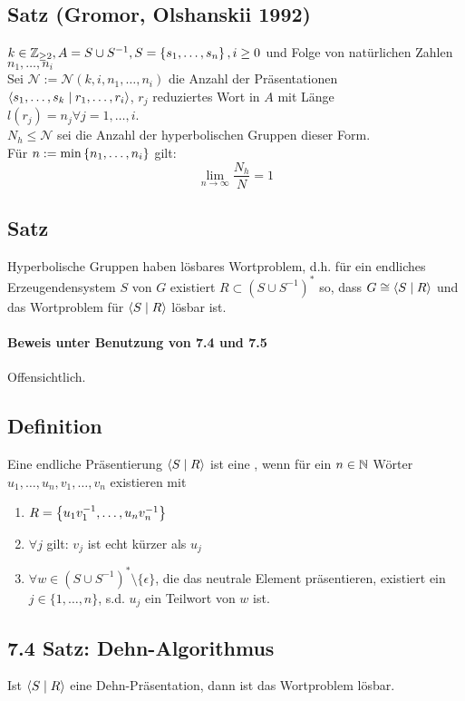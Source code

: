 \documentclass{article}
\begin{document}
\subsection{Satz (Gromor, Olshanskii 1992)}
$k \in \Z_{\geq 2}, A = S\cup S^{-1}, S = \set{s_1,\ldots,s_n}{}, i \geq 0$ und Folge von natürlichen Zahlen $n_1,\ldots,n_i$\\
Sei $\mathcal{N} := \mathcal{N}(k,i,n_1,\ldots, n_i)$ die Anzahl der Präsentationen $\grp{s_1,\ldots, s_k}{r_1,\ldots, r_i}$, $r_j$ reduziertes Wort in $A$ mit Länge $l(r_j) = n_j \forall j = 1,\ldots, i$.\\
$N_h \leq \mathcal{N}$ sei die Anzahl der hyperbolischen Gruppen dieser Form.\\
Für $n := \min\set{n_1,\ldots, n_i}{}$ gilt:
\[\lim\limits_{n \rightarrow \infty} \frac{N_h}{N} = 1 \]

\subsection{Satz}
Hyperbolische Gruppen haben lösbares Wortproblem, d.h. für ein endliches Erzeugendensystem $S$ von $G$ existiert $R \subset (S\cup S^{-1})^*$ so, dass $G \cong \grp{S}{R}$ und das Wortproblem für $\grp{S}{R}$ lösbar ist.

\paragraph{Beweis unter Benutzung von 7.4 und 7.5} Offensichtlich.

\subsection{Definition}
Eine endliche Präsentierung $\grp{S}{R}$ ist eine , wenn für ein $n \in \mathbb{N}$ Wörter $u_1,\ldots, u_n, v_1,\ldots, v_n$ existieren mit
\begin{enumerate}
	\item $R = \set{u_1v_1^{-1},\ldots, u_nv_n^{-1}}{}$
	\item $\forall j$ gilt: $v_j$ ist echt kürzer als $u_j$
	\item $\forall w \in (S\cup S^{-1})^*\setminus\{\epsilon\}$, die das neutrale Element präsentieren, existiert ein $j \in \{1,\ldots, n\}$, s.d. $u_j$ ein Teilwort von $w$ ist.
\end{enumerate}


\subsection{7.4 Satz: Dehn-Algorithmus}
Ist $\grp{S}{R}$ eine Dehn-Präsentation, dann ist das Wortproblem lösbar.
\end{document}

